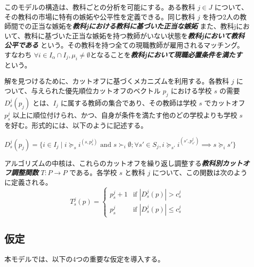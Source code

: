 \documentclass[12pt, a4paper]{article}
\theoremstyle{definition}
\theoremstyle{remark}
\theoremstyle{plain}
\begin{document}






このモデルの構造は、教科ごとの分析を可能にする。ある教科 $j \in J$ について、その教科の市場に特有の嫉妬や公平性を定義できる。同じ教科 $j$ を持つ2人の教師間での正当な嫉妬を\textbf{\textit{教科jにおける教科に基づいた正当な嫉妬}} また、教科jにおいて、教科に基づいた正当な嫉妬を持つ教師がいない状態を\textbf{\textit{教科jにおいて教科公平である}} という。その教科を持つ全ての現職教師が雇用されるマッチング。すなわち $\forall i \in I_\alpha \cap I_j, \mu_i \neq \emptyset$となることを\textbf{\textit{教科jにおいて現職必置条件を満たす}} という。

解を見つけるために、カットオフに基づくメカニズムを利用する。各教科 $j$ について、与えられた優先順位カットオフのベクトル $p_j$ における学校 $s$ の需要 $D^j_s(p_j)$ とは、$I_j$ に属する教師の集合であり、その教師は学校 $s$ でカットオフ $p^j_s$ 以上に順位付けられ、かつ、自身が条件を満たす他のどの学校よりも学校 $s$ を好む。形式的には、以下のように記述する。

$D^j_s(p_j) = \{ i \in I_j \mid i \succeq_s i^{(s,p^j_s)} \text{ and } s \succ_i \emptyset; \forall s' \in S_j, i \succeq_{s'} i^{(s',p^j_{s'})} \implies s \succeq_i s' \}$

アルゴリズムの中核は、これらのカットオフを繰り返し調整する\textbf{\textit{教科別カットオフ調整関数}} $T : P \rightarrow P$ である。各学校 $s$ と教科 $j$ について、この関数は次のように定義される。
\[
T_s^j(p) =
\begin{cases}
p_s^j + 1 & \text{if } | D_s^j(p) | > c^j_s \\
p_s^j     & \text{if } | D_s^j(p) | \leq c^j_s
\end{cases}
\]

\subsection{仮定}
本モデルでは、以下の4つの重要な仮定を導入する。
\end{document}
